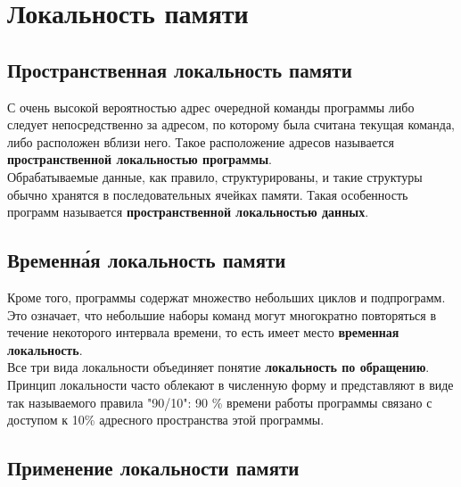 \section{Локальность памяти}
\subsection{Пространственная локальность памяти}
С очень высокой вероятностью адрес очередной команды программы либо следует непосредственно за адресом, по которому была считана текущая команда, либо расположен вблизи него. Такое расположение адресов называется \textbf{пространственной локальностью программы}.
\\Обрабатываемые данные, как правило, структурированы, и такие структуры обычно хранятся в последовательных ячейках памяти. Такая особенность программ называется \textbf{пространственной локальностью данных}.
\subsection{Временн\'ая локальность памяти}
Кроме того, программы содержат множество небольших циклов и подпрограмм. Это означает, что небольшие наборы команд могут многократно
повторяться в течение некоторого интервала времени, то есть имеет место \textbf{временная локальность}.
\\Все три вида локальности объединяет понятие \textbf{локальность по обращению}. Принцип локальности часто облекают в численную форму и представляют в виде так называемого правила "90/10": 90 \%
 времени работы программы связано с доступом к 10\%
  адресного пространства этой программы.
  \subsection{Применение локальности памяти}
 

